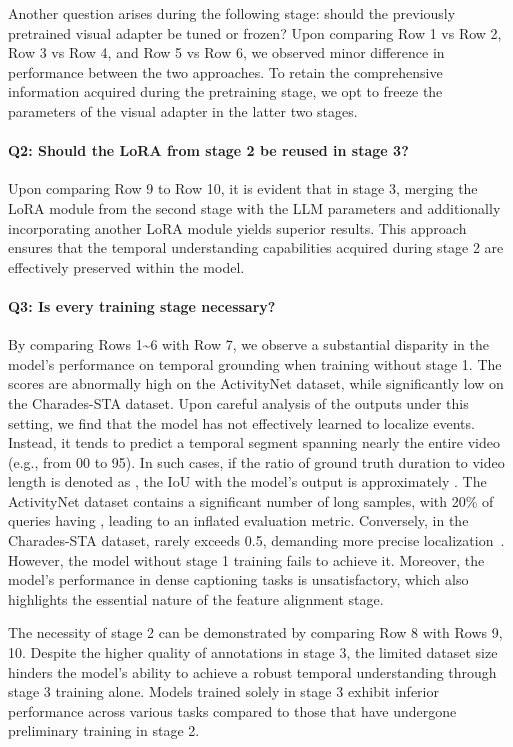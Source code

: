 \documentclass[10pt,twocolumn,letterpaper]{article}
\begin{document}
Another question arises during the following stage: should the previously pretrained visual adapter be tuned or frozen? Upon comparing Row 1 vs Row 2, Row 3 vs Row 4, and Row 5 vs Row 6, we observed minor difference in performance between the two approaches. To retain the comprehensive information acquired during the pretraining stage, we opt to freeze the parameters of the visual adapter in the latter two stages.

\paragraph{Q2: Should the LoRA from stage 2 be reused in stage 3?}  Upon comparing Row 9 to Row 10, it is evident that in stage 3, merging the LoRA module from the second stage with the LLM parameters and additionally incorporating another LoRA module yields superior results. This approach ensures that the temporal understanding capabilities acquired during stage 2 are effectively preserved within the model.
 
\paragraph{Q3: Is every training stage necessary?} By comparing Rows 1\textasciitilde 6 with Row 7, we observe a substantial disparity in the model's performance on temporal grounding when training without stage 1. The scores are abnormally high on the ActivityNet dataset, while significantly low on the Charades-STA dataset. Upon careful analysis of the outputs under this setting, we find that the model has not effectively learned to localize events. Instead, it
tends to predict a temporal segment spanning nearly the entire video (e.g., from 00 to 95). In such cases, if the ratio of ground truth duration to video length is denoted as , the IoU with the model's output is approximately . The ActivityNet dataset contains a significant number of long samples, with 20\% of queries having , leading to an inflated evaluation metric. Conversely, in the Charades-STA dataset,  rarely exceeds 0.5, demanding more precise localization~\cite{lan2023closer}. However, the model without stage 1 training fails to achieve it. Moreover, the model's performance in dense captioning tasks is unsatisfactory, which also highlights the essential nature of the feature alignment stage.

The necessity of stage 2 can be demonstrated by comparing Row 8 with Rows 9, 10. Despite the higher quality of annotations in stage 3, the limited dataset size hinders the model's ability to achieve a robust temporal understanding through stage 3 training alone. Models trained solely in stage 3 exhibit inferior performance across various tasks compared to those that have undergone preliminary training in stage 2.
\end{document}
